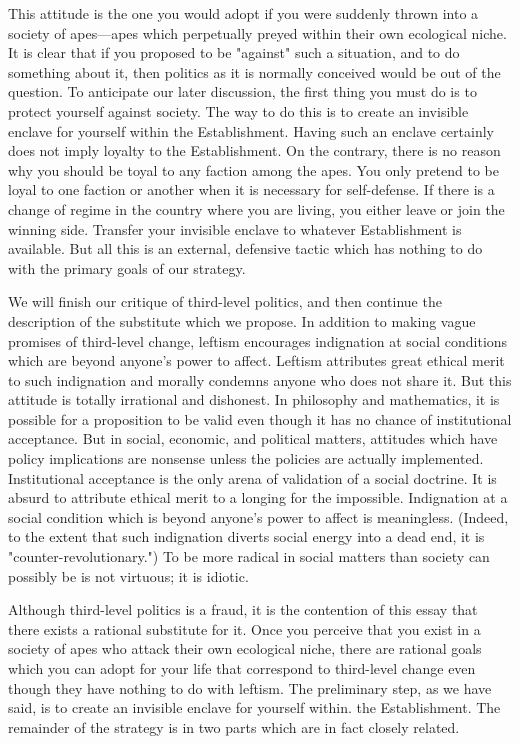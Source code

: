 This attitude is the one you would adopt if you were suddenly thrown 
into a society of apes---apes which perpetually preyed within their own 
ecological niche. It is clear that if you proposed to be "against" such a 
situation, and to do something about it, then politics as it is normally 
conceived would be out of the question. To anticipate our later discussion, 
the first thing you must do is to protect yourself against society. The way to 
do this is to create an invisible enclave for yourself within the Establishment. 
Having such an enclave certainly does not imply loyalty to the 
Establishment. On the contrary, there is no reason why you should be toyal 
to any faction among the apes. You only pretend to be loyal to one faction 
or another when it is necessary for self-defense. If there is a change of regime 
in the country where you are living, you either leave or join the winning side. 
Transfer your invisible enclave to whatever Establishment is available. But all 
this is an external, defensive tactic which has nothing to do with the primary 
goals of our strategy. 

We will finish our critique of third-level politics, and then continue the 
description of the substitute which we propose. In addition to making vague 
promises of third-level change, leftism encourages indignation at social 
conditions which are beyond anyone's power to affect. Leftism attributes 
great ethical merit to such indignation and morally condemns anyone who 
does not share it. But this attitude is totally irrational and dishonest. In 
philosophy and mathematics, it is possible for a proposition to be valid even 
though it has no chance of institutional acceptance. But in social, economic, 
and political matters, attitudes which have policy implications are nonsense 
unless the policies are actually implemented. Institutional acceptance is the 
only arena of validation of a social doctrine. It is absurd to attribute ethical 
merit to a longing for the impossible. Indignation at a social condition which 
is beyond anyone's power to affect is meaningless. (Indeed, to the extent 
that such indignation diverts social energy into a dead end, it is 
"counter-revolutionary.") To be more radical in social matters than society 
can possibly be is not virtuous; it is idiotic. 

Although third-level politics is a fraud, it is the contention of this essay 
that there exists a rational substitute for it. Once you perceive that you exist 
in a society of apes who attack their own ecological niche, there are rational 
goals which you can adopt for your life that correspond to third-level change 
even though they have nothing to do with leftism. The preliminary step, as 
we have said, is to create an invisible enclave for yourself within. the 
Establishment. The remainder of the strategy is in two parts which are in 
fact closely related. 

